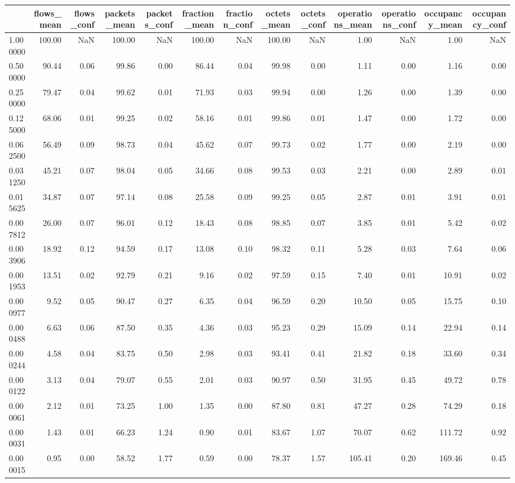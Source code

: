 \begin{tabular}{lrrrrrrrrrrrr}
\toprule
 & flows_mean & flows_conf & packets_mean & packets_conf & fraction_mean & fraction_conf & octets_mean & octets_conf & operations_mean & operations_conf & occupancy_mean & occupancy_conf \\
\midrule
1.000000 & 100.00 & NaN & 100.00 & NaN & 100.00 & NaN & 100.00 & NaN & 1.00 & NaN & 1.00 & NaN \\
0.500000 & 90.44 & 0.06 & 99.86 & 0.00 & 86.44 & 0.04 & 99.98 & 0.00 & 1.11 & 0.00 & 1.16 & 0.00 \\
0.250000 & 79.47 & 0.04 & 99.62 & 0.01 & 71.93 & 0.03 & 99.94 & 0.00 & 1.26 & 0.00 & 1.39 & 0.00 \\
0.125000 & 68.06 & 0.01 & 99.25 & 0.02 & 58.16 & 0.01 & 99.86 & 0.01 & 1.47 & 0.00 & 1.72 & 0.00 \\
0.062500 & 56.49 & 0.09 & 98.73 & 0.04 & 45.62 & 0.07 & 99.73 & 0.02 & 1.77 & 0.00 & 2.19 & 0.00 \\
0.031250 & 45.21 & 0.07 & 98.04 & 0.05 & 34.66 & 0.08 & 99.53 & 0.03 & 2.21 & 0.00 & 2.89 & 0.01 \\
0.015625 & 34.87 & 0.07 & 97.14 & 0.08 & 25.58 & 0.09 & 99.25 & 0.05 & 2.87 & 0.01 & 3.91 & 0.01 \\
0.007812 & 26.00 & 0.07 & 96.01 & 0.12 & 18.43 & 0.08 & 98.85 & 0.07 & 3.85 & 0.01 & 5.42 & 0.02 \\
0.003906 & 18.92 & 0.12 & 94.59 & 0.17 & 13.08 & 0.10 & 98.32 & 0.11 & 5.28 & 0.03 & 7.64 & 0.06 \\
0.001953 & 13.51 & 0.02 & 92.79 & 0.21 & 9.16 & 0.02 & 97.59 & 0.15 & 7.40 & 0.01 & 10.91 & 0.02 \\
0.000977 & 9.52 & 0.05 & 90.47 & 0.27 & 6.35 & 0.04 & 96.59 & 0.20 & 10.50 & 0.05 & 15.75 & 0.10 \\
0.000488 & 6.63 & 0.06 & 87.50 & 0.35 & 4.36 & 0.03 & 95.23 & 0.29 & 15.09 & 0.14 & 22.94 & 0.14 \\
0.000244 & 4.58 & 0.04 & 83.75 & 0.50 & 2.98 & 0.03 & 93.41 & 0.41 & 21.82 & 0.18 & 33.60 & 0.34 \\
0.000122 & 3.13 & 0.04 & 79.07 & 0.55 & 2.01 & 0.03 & 90.97 & 0.50 & 31.95 & 0.45 & 49.72 & 0.78 \\
0.000061 & 2.12 & 0.01 & 73.25 & 1.00 & 1.35 & 0.00 & 87.80 & 0.81 & 47.27 & 0.28 & 74.29 & 0.18 \\
0.000031 & 1.43 & 0.01 & 66.23 & 1.24 & 0.90 & 0.01 & 83.67 & 1.07 & 70.07 & 0.62 & 111.72 & 0.92 \\
0.000015 & 0.95 & 0.00 & 58.52 & 1.77 & 0.59 & 0.00 & 78.37 & 1.57 & 105.41 & 0.20 & 169.46 & 0.45 \\

\end{tabular}
